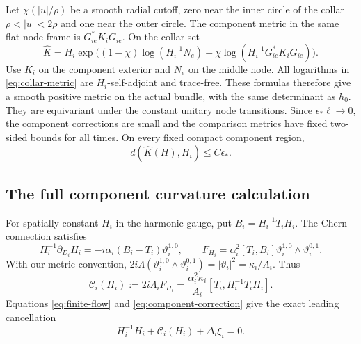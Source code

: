 Let $\chi(|u|/\rho)$ be a smooth radial cutoff, zero near the inner
circle of the collar $\rho<|u|<2\rho$ and one near the outer circle.
The component metric in the same flat node frame is $G_{ie}^*K_iG_{ie}$.
On the collar set
\begin{equation}\label{eq:collar-metric}
 \widehat K=H_i\exp\bigl((1-\chi)\log(H_i^{-1}N_e)
             +\chi\log(H_i^{-1}G_{ie}^*K_iG_{ie})\bigr).
\end{equation}
Use $K_i$ on the component exterior and $N_e$ on the middle node.
All logarithms in \eqref{eq:collar-metric} are $H_i$-self-adjoint
and trace-free. These formulas therefore give a smooth positive metric
on the actual bundle, with the same determinant as $h_0$. They are
equivariant under the constant unitary node transitions. Since
$\epsilon_*\ell\to0$, the component corrections are small and
the comparison metrics have fixed two-sided bounds for all times.
On every fixed compact component region,
\begin{equation}\label{eq:compact-reconstruction}
 d(\widehat K(H),H_i)\le C\epsilon_*.
\end{equation}

\subsection{The full component curvature calculation}
For spatially constant $H_i$ in the harmonic gauge, put
$B_i=H_i^{-1}T_iH_i$. The Chern connection satisfies
\[
 H_i^{-1}\partial_{D_i}H_i
       =-i\alpha_i(B_i-T_i)\vartheta_i^{1,0},\qquad
 F_{H_i}=\alpha_i^2[T_i,B_i]
                  \vartheta_i^{1,0}\wedge\vartheta_i^{0,1}.
\]
With our metric convention,
$2i\Lambda(\vartheta_i^{1,0}\wedge\vartheta_i^{0,1})
=|\vartheta_i|^2=\kappa_i/A_i$. Thus
\begin{equation}\label{eq:constant-curvature}
 \mathcal C_i(H_i):=2i\Lambda_iF_{H_i}
      =\frac{\alpha_i^2\kappa_i}{A_i}
                  [T_i,H_i^{-1}T_iH_i].
\end{equation}
Equations \eqref{eq:finite-flow} and \eqref{eq:component-correction}
give the exact leading cancellation
\begin{equation}\label{eq:component-cancellation}
 H_i^{-1}\dot H_i+\mathcal C_i(H_i)+\Delta_i\xi_i=0.
\end{equation}

